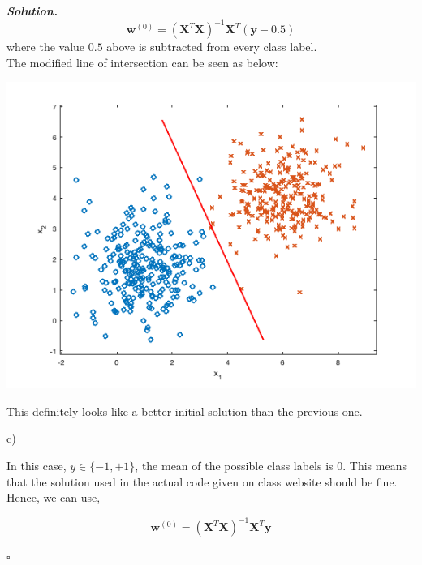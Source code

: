 \documentclass[10pt]{article}
\newenvironment{solution}[1][\it{Solution}]{\textbf{#1. } }{$\square$}
\begin{document}
\begin{solution}
$$
\mathbf{w}^{(0)}=\left(\mathbf{X}^{T} \mathbf{X}\right)^{-1} \mathbf{X}^{T} (\mathbf{y} - 0.5)
$$
where the value $0.5$ above is subtracted from every class label.
\\

The modified line of intersection can be seen as below:

\begin{center}
\includegraphics[width=16cm, keepaspectratio]{Final_Separation_Line_Class}
\end{center}

This definitely looks like a better initial solution than the previous one.

c)

In this case, $y \in \{-1, + 1\}$, the mean of the possible class labels is $0$. This means that the solution used in the actual code given on class website should be fine. Hence, we can use,

$$
\mathbf{w}^{(0)}=\left(\mathbf{X}^{T} \mathbf{X}\right)^{-1} \mathbf{X}^{T} \mathbf{y}
$$

\end{solution}
\end{document}
